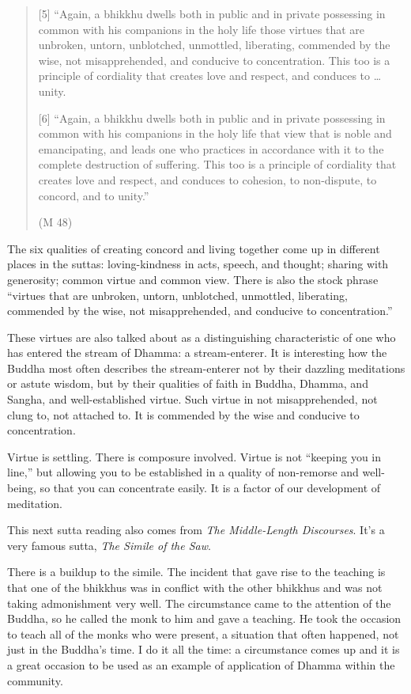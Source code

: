 \begin{quotation}
{[}5{]} “Again, a bhikkhu dwells both in public and in private
possessing in common with his companions in the holy life those virtues
that are unbroken, untorn, unblotched, unmottled, liberating, commended
by the wise, not misapprehended, and conducive to concentration. This
too is a principle of cordiality that creates love and respect, and
conduces to \ldots{} unity.

{[}6{]} “Again, a bhikkhu dwells both in public and in private
possessing in common with his companions in the holy life that view that
is noble and emancipating, and leads one who practices in accordance
with it to the complete destruction of suffering. This too is a
principle of cordiality that creates love and respect, and conduces to
cohesion, to non-dispute, to concord, and to unity.”

\hspace*{\fill}(M 48)
\end{quotation}

The six qualities of creating concord and living together come up in
different places in the suttas: loving-kindness in acts, speech, and
thought; sharing with generosity; common virtue and common view. There
is also the stock phrase “virtues that are unbroken, untorn, unblotched,
unmottled, liberating, commended by the wise, not misapprehended, and
conducive to concentration.”

These virtues are also talked about as a distinguishing characteristic
of one who has entered the stream of Dhamma: a stream-enterer. It is
interesting how the Buddha most often describes the stream-enterer not
by their dazzling meditations or astute wisdom, but by their qualities
of faith in Buddha, Dhamma, and Sangha, and well-established virtue.
Such virtue in not misapprehended, not clung to, not attached to. It is
commended by the wise and conducive to concentration.

Virtue is settling. There is composure involved. Virtue is not “keeping
you in line,” but allowing you to be established in a quality of
non-remorse and well-being, so that you can concentrate easily. It is a
factor of our development of meditation.

This next sutta reading also comes from \emph{The Middle-Length
Discourses}. It’s a very famous sutta, \emph{The Simile of the Saw}.

There is a buildup to the simile. The incident that gave rise to the
teaching is that one of the bhikkhus was in conflict with the other
bhikkhus and was not taking admonishment very well. The circumstance
came to the attention of the Buddha, so he called the monk to him and
gave a teaching. He took the occasion to teach all of the monks who were
present, a situation that often happened, not just in the Buddha’s time.
I do it all the time: a circumstance comes up and it is a great occasion
to be used as an example of application of Dhamma within the community.

